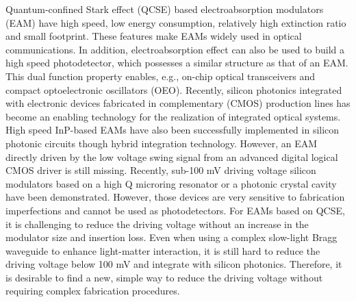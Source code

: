 \documentclass[aip,apl,reprint,a4paper]{revtex4-1}
\begin{document}

\maketitle %


Quantum-confined Stark effect (QCSE) based electroabsorption modulators (EAM) have high speed, low energy consumption, relatively high extinction ratio and small footprint.\cite{Yong40,Fukano} These features make EAMs widely used in optical communications. In addition, electroabsorption effect can also be used to build a high speed photodetector, which possesses a similar structure as that of an EAM.\cite{Welstand} This dual function property enables, e.g., on-chip optical transceivers \cite{Transceiver} and compact optoelectronic oscillators (OEO).\cite{Zhou} Recently, silicon photonics integrated with electronic devices fabricated in complementary (CMOS) production lines has become an enabling technology for the realization of integrated optical systems.\cite{Marpaung,Sun} High speed InP-based EAMs have also been successfully implemented in silicon photonic circuits though hybrid integration technology.\cite{Yong40,Transceiver,roelkensiii-v-on-silicon2015,fu52015} However, an EAM directly driven by the low voltage swing signal from an advanced digital logical CMOS driver is still missing. Recently, sub-100 mV driving voltage silicon modulators based on a high Q microring resonator or a photonic crystal cavity have been demonstrated.\cite{Manipatruni,Shakoor:14} However, those devices are very sensitive to fabrication imperfections and cannot be used as photodetectors. For EAMs based on QCSE, it is challenging to reduce the driving voltage without an increase in the modulator size and insertion loss. Even when using a complex slow-light Bragg waveguide to enhance light-matter interaction, it is still hard to reduce the driving voltage below 100 mV and integrate with silicon photonics.\cite{gulow-voltage2013} Therefore, it is desirable to find a new, simple way to reduce the driving voltage without requiring complex fabrication procedures.
\end{document}
